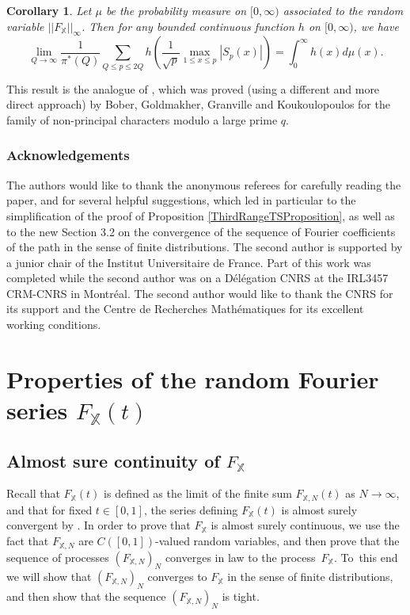 \documentclass[10pt]{amsart}
\theoremstyle{plain}
\newtheorem{cor}[thm]{Corollary}
\theoremstyle{definition}
\newcommand{\X}{\mathbb{X}}
\begin{document}
\begin{cor}\label{Cor: Distribution Maximum} Let $\mu$ be the probability measure on $[0, \infty)$ associated to the random variable $||F_{\X}||_{\infty}$. Then for any bounded
continuous function $h$ on $[0, \infty)$, we have
\[
\lim_{Q \to \infty} \frac{1}{\pi^*(Q)}\sum_{Q\leq p\leq 2Q} h\left(\frac{1}{\sqrt{p}}\max_{1\leq x\leq p} |S_p(x)|\right)= \int_0^{\infty} h(x) d\mu (x).\]
\end{cor}
This result is the analogue of \cite[Th.\,1.4]{BGGK}, which was proved (using a different and more direct approach) by Bober, Goldmakher, Granville and Koukoulopoulos for the family of non-principal characters modulo a large prime $q$.

\subsubsection*{Acknowledgements} The authors would like to thank the anonymous referees for carefully reading the paper, and for several helpful suggestions, which led in particular to the simplification of the proof of Proposition \ref{ThirdRangeTSProposition}, as well as to the new Section 3.2 on the convergence of the sequence of Fourier coefficients of the path in the sense of finite distributions. The second author is supported by a junior chair of the Institut Universitaire de France. Part of this work was completed while the second author was on a Délégation CNRS at the IRL3457 CRM-CNRS in Montréal. The second author would like to thank the CNRS for its support and the Centre de Recherches Mathématiques for its excellent working conditions.

\section{Properties of the random Fourier series \texorpdfstring{$F_{\X}(t)$}{Ft}}\label{s: Random Fourier}

\subsection{Almost sure continuity of $F_{\X}$}

Recall that $F_{\X}(t)$ is defined as the limit of the finite sum $F_{\X, N}(t)$ as $N\to \infty$, and that for fixed $t\in [0, 1]$, the series defining $F_{\X}(t)$ is almost surely convergent by \cite[Lem.\,1]{Ka}. In order to prove that $F_{\X}$ is almost surely continuous, we use the fact that $F_{\X, N}$ are $C([0,1])$-valued random variables, and then prove that the sequence of processes $(F_{\X, N})_{N}$ converges in law to the process~$F_{\X}$. To~this end we will show that $(F_{\X, N})_{N}$ converges to $F_{\X}$ in the sense of finite distributions, and then show that the sequence $(F_{\X, N})_{N}$ is tight.
\end{document}
